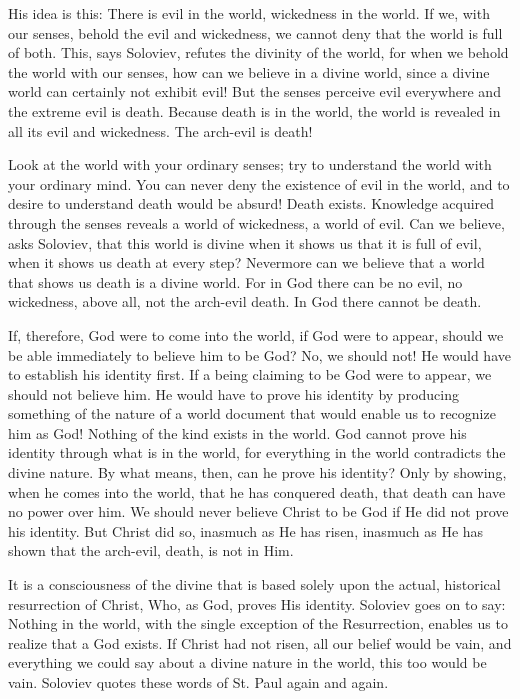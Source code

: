 \begin{quotationx}
His idea is this: There is evil in the world, wickedness in the world. If we, with our senses, behold the evil and wickedness, we cannot deny that the world is full of both. This, says Soloviev, refutes the divinity of the world, for when we behold the world with our senses, how can we believe in a divine world, since a divine world can certainly not exhibit evil! But the senses perceive evil everywhere and the extreme evil is death. Because death is in the world, the world is revealed in all its evil and wickedness. The arch-evil is death!

Look at the world with your ordinary senses; try to understand the world with your ordinary mind. You can never deny the existence of evil in the world, and to desire to understand death would be absurd! Death exists. Knowledge acquired through the senses reveals a world of wickedness, a world of evil. Can we believe, asks Soloviev, that this world is divine when it shows us that it is full of evil, when it shows us death at every step? Nevermore can we believe that a world that shows us death is a divine world. For in God there can be no evil, no wickedness, above all, not the arch-evil death. In God there cannot be death.

If, therefore, God were to come into the world, if God were to appear, should we be able immediately to believe him to be God? No, we should not! He would have to establish his identity first. If a being claiming to be God were to appear, we should not believe him. He would have to prove his identity by producing something of the nature of a world document that would enable us to recognize him as God! Nothing of the kind exists in the world. God cannot prove his identity through what is in the world, for everything in the world contradicts the divine nature. By what means, then, can he prove his identity? Only by showing, when he comes into the world, that he has conquered death, that death can have no power over him. We should never believe Christ to be God if He did not prove his identity. But Christ did so, inasmuch as He has risen, inasmuch as He has shown that the arch-evil, death, is not in Him.

It is a consciousness of the divine that is based solely upon the actual, historical resurrection of Christ, Who, as God, proves His identity. Soloviev goes on to say: Nothing in the world, with the single exception of the Resurrection, enables us to realize that a God exists. If Christ had not risen, all our belief would be vain, and everything we could say about a divine nature in the world, this too would be vain. Soloviev quotes these words of St. Paul again and again.


\end{quotationx}
